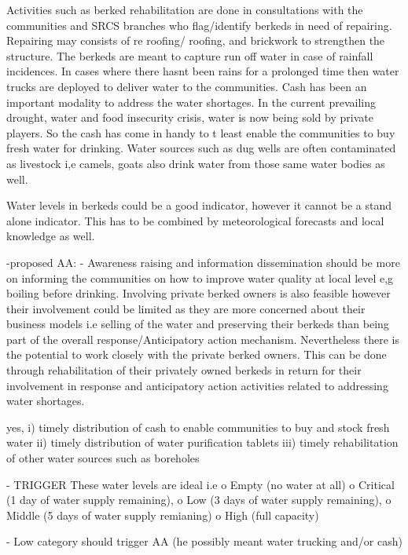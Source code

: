 Activities such as berked rehabilitation are done in consultations with the communities and SRCS branches who flag/identify berkeds in need of repairing. Repairing may consists of re roofing/ roofing, and brickwork to strengthen the structure. The berkeds are meant to capture run off water in case of rainfall incidences. In cases where there hasnt been rains for a prolonged time then water trucks are deployed to deliver water to the communities. Cash has been an important modality to address the water shortages. In the current prevailing drought, water and food insecurity crisis, water is now being sold by private players. So the cash has come in handy to t least enable the communities to buy fresh water for drinking. Water sources such as dug wells are often contaminated as livestock i,e camels, goats also drink water from those same water bodies as well.

Water levels in berkeds could be a good indicator, however it cannot be a stand alone indicator. This has to be combined by meteorological forecasts and local knowledge as well.

-proposed AA:
-	Awareness raising and information dissemination should be more on informing the communities on how to improve water quality at local level e,g boiling before drinking. Involving private berked owners is also feasible however their involvement could be limited as they are more concerned about their business models i.e selling of the water and preserving their berkeds than being part of the overall response/Anticipatory action mechanism. Nevertheless there is the potential to work closely with the private berked owners. This can be done through rehabilitation of their privately owned berkeds in return for their involvement in response and anticipatory action activities related to addressing water shortages.

yes, i) timely distribution of cash to enable communities to buy and stock fresh water
ii) timely distribution of water purification tablets
iii) timely rehabilitation of other water sources such as boreholes

- TRIGGER
These water levels are ideal i.e 
o	Empty (no water at all) 
o	Critical (1 day of water supply remaining), 
o	Low (3 days of water supply remaining), 
o	Middle (5 days of water supply remianing) 
o	High (full capacity)

-	Low category should trigger AA (he possibly meant water trucking and/or cash)

